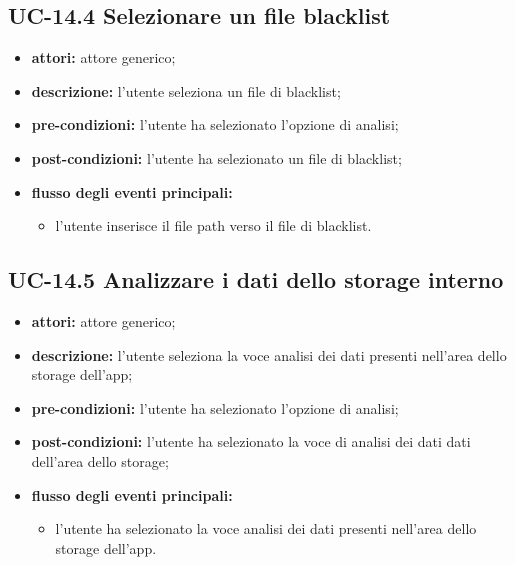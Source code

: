 \subsection*{UC-14.4 Selezionare un file blacklist}
\begin{itemize}
    \item \textbf{attori:} attore generico;
    \item \textbf{descrizione:} l'utente seleziona un file di blacklist;
    \item \textbf{pre-condizioni:} l'utente ha selezionato l'opzione di analisi;
    \item \textbf{post-condizioni:} l'utente ha selezionato un file di blacklist;
    \item \textbf{flusso degli eventi principali:}
    \begin{itemize}
        \item l'utente inserisce il file path verso il file di blacklist.
    \end{itemize}
\end{itemize}
\subsection*{UC-14.5 Analizzare i dati dello storage interno}
\begin{itemize}
    \item \textbf{attori:} attore generico;
    \item \textbf{descrizione:} l'utente seleziona la voce analisi dei dati presenti nell'area dello storage dell'app;
    \item \textbf{pre-condizioni:} l'utente ha selezionato l'opzione di analisi;
    \item \textbf{post-condizioni:} l'utente ha selezionato la voce di analisi dei dati dati dell'area dello storage;
    \item \textbf{flusso degli eventi principali:}
    \begin{itemize}
        \item l'utente ha selezionato la voce analisi dei dati presenti nell'area dello storage dell'app.
    \end{itemize}
\end{itemize}

